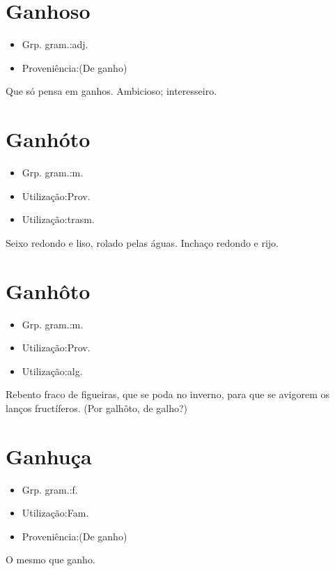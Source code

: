 \section{Ganhoso}
\begin{itemize}
\item {Grp. gram.:adj.}
\end{itemize}
\begin{itemize}
\item {Proveniência:(De \textunderscore ganho\textunderscore )}
\end{itemize}
Que só pensa em ganhos.
Ambicioso; interesseiro.
\section{Ganhóto}
\begin{itemize}
\item {Grp. gram.:m.}
\end{itemize}
\begin{itemize}
\item {Utilização:Prov.}
\end{itemize}
\begin{itemize}
\item {Utilização:trasm.}
\end{itemize}
Seixo redondo e liso, rolado pelas águas.
Inchaço redondo e rijo.
\section{Ganhôto}
\begin{itemize}
\item {Grp. gram.:m.}
\end{itemize}
\begin{itemize}
\item {Utilização:Prov.}
\end{itemize}
\begin{itemize}
\item {Utilização:alg.}
\end{itemize}
Rebento fraco de figueiras, que se poda no inverno, para que se avigorem os lanços fructíferos.
(Por \textunderscore galhôto\textunderscore , de \textunderscore galho\textunderscore ?)
\section{Ganhuça}
\begin{itemize}
\item {Grp. gram.:f.}
\end{itemize}
\begin{itemize}
\item {Utilização:Fam.}
\end{itemize}
\begin{itemize}
\item {Proveniência:(De \textunderscore ganho\textunderscore )}
\end{itemize}
O mesmo que \textunderscore ganho\textunderscore .

